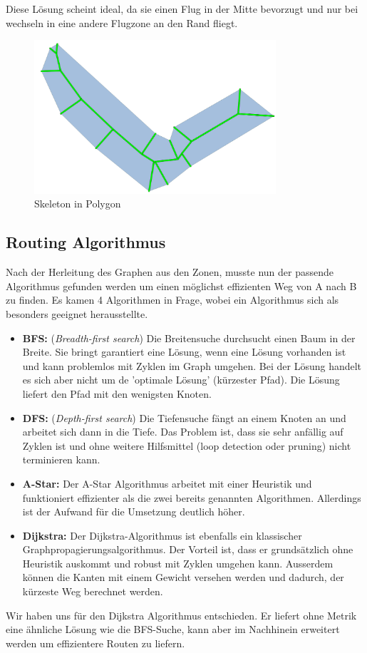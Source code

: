 Diese Lösung scheint ideal, da sie einen Flug in der Mitte bevorzugt und nur bei wechseln in eine andere Flugzone an den Rand fliegt.

\begin{figure}[H]
	\centering
	\includegraphics[width=0.8\textwidth]{images/routing/skeleton.png}
	\caption{Skeleton in Polygon}
	\label{fig:skeleton-in-polygon}
\end{figure}

\subsection{Routing Algorithmus}
Nach der Herleitung des Graphen aus den Zonen, musste nun der passende Algorithmus gefunden werden um einen möglichst effizienten Weg von A nach B zu finden. Es kamen 4 Algorithmen in Frage, wobei ein Algorithmus sich als besonders geeignet herausstellte.
\begin{itemize}
	\item{\textbf{BFS:} (\textit{Breadth-first search}) Die Breitensuche durchsucht einen Baum in der Breite. Sie bringt garantiert eine Lösung, wenn eine Lösung vorhanden ist und kann problemlos mit Zyklen im Graph umgehen. Bei der Lösung handelt es sich aber nicht um de 'optimale Lösung' (kürzester Pfad). Die Lösung liefert den Pfad mit den wenigsten Knoten. \cite{AiClass}}
	\item{\textbf{DFS:} (\textit{Depth-first search}) Die Tiefensuche fängt an einem Knoten an und arbeitet sich dann in die Tiefe. Das Problem ist, dass sie sehr anfällig auf Zyklen ist und ohne weitere Hilfsmittel (loop detection oder pruning) nicht terminieren kann. \cite{AiClass}}
	\item{\textbf{A-Star:} Der A-Star Algorithmus arbeitet mit einer Heuristik und funktioniert effizienter als die zwei bereits genannten Algorithmen. Allerdings ist der Aufwand für die Umsetzung deutlich höher. \cite{AiClass}}
	\item{\textbf{Dijkstra:} Der Dijkstra-Algorithmus ist ebenfalls ein klassischer Graphpropagierungsalgorithmus. Der Vorteil ist, dass er grundsätzlich ohne Heuristik auskommt und robust mit Zyklen umgehen kann. Ausserdem können die Kanten mit einem Gewicht versehen werden und dadurch, der kürzeste Weg berechnet werden.}
\end{itemize}
Wir haben uns für den Dijkstra Algorithmus entschieden. Er liefert ohne Metrik eine ähnliche Lösung wie die BFS-Suche, kann aber im Nachhinein erweitert werden um effizientere Routen zu liefern.

